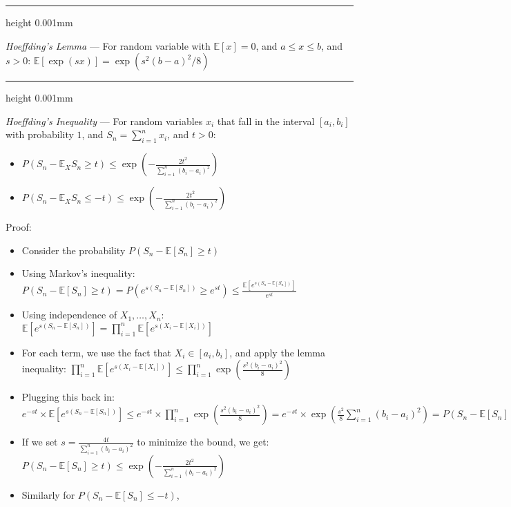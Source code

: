 {\color{lightgray}\hrule height 0.001mm}

\emph{Hoeffding's Lemma} --- For random variable with $\mathbb{E}[x] = 0$, and $a \leq x \leq b$, and $s > 0$: $\mathbb{E}[\exp(sx)] = \exp(s^2(b-a)^2/8)$

{\color{lightgray}\hrule height 0.001mm}

\emph{Hoeffding's Inequality} --- For random variables $x_i$ that fall in the interval $[a_i,b_i]$ with probability $1$, and $S_n = \sum_{i=1}^n x_i$, and $t > 0$: \begin{itemize}
    \item $P\left(S_n - \mathbb{E}_X S_n \geq t\right) \leq \exp\left(-\frac{2t^2}{\sum_{i=1}^n (b_i - a_i)^2}\right)$
    \item $P\left(S_n - \mathbb{E}_X S_n \leq -t\right) \leq \exp\left(-\frac{2t^2}{\sum_{i=1}^n (b_i - a_i)^2}\right)$
\end{itemize}
Proof:
\begin{itemize}
    \item Consider the probability $P(S_n - \mathbb{E}[S_n] \geq t)$
    \item Using Markov's inequality:
    $
    P(S_n - \mathbb{E}[S_n] \geq t) = P\left(e^{s(S_n - \mathbb{E}[S_n])} \geq e^{st}\right) \leq \frac{\mathbb{E}[e^{s(S_n - \mathbb{E}[S_n])}]}{e^{st}}
    $
    \item Using independence of $X_1, \dots, X_n$:
    $
    \mathbb{E}[e^{s(S_n - \mathbb{E}[S_n])}] = \prod_{i=1}^n \mathbb{E}[e^{s(X_i - \mathbb{E}[X_i])}]
    $
    \item For each term, we use the fact that $X_i \in [a_i, b_i]$, and apply the lemma inequality:
    $
    \prod_{i=1}^n \mathbb{E}[e^{s(X_i - \mathbb{E}[X_i])}] \leq \prod_{i=1}^n\exp\left(\frac{s^2(b_i - a_i)^2}{8}\right)
    $
    \item Plugging this back in:
    $
    e^{-st} \times \mathbb{E}[e^{s(S_n - \mathbb{E}[S_n])}] \leq e^{-st} \times \prod_{i=1}^n \exp\left(\frac{s^2(b_i - a_i)^2}{8}\right) = e^{-st} \times \exp\left(\frac{s^2}{8} \sum_{i=1}^n (b_i - a_i)^2\right) = P(S_n - \mathbb{E}[S_n] \geq t) \leq \exp\left(-st + \frac{s^2}{8} \sum_{i=1}^n (b_i - a_i)^2\right)
    $
    \item If we set $s = \frac{4t}{\sum_{i=1}^n (b_i - a_i)^2}$ to minimize the bound, we get:
    $
    P(S_n - \mathbb{E}[S_n] \geq t) \leq \exp\left(-\frac{2t^2}{\sum_{i=1}^n (b_i - a_i)^2}\right)
    $
    \item Similarly for $P(S_n - \mathbb{E}[S_n] \leq -t)$,
\end{itemize}
